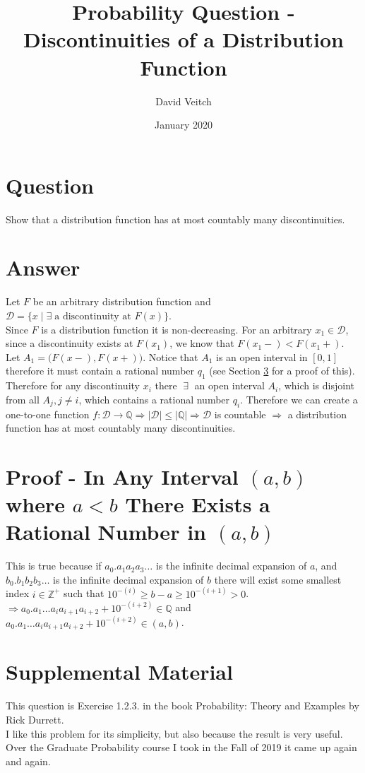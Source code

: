 \documentclass{article}
\title{Probability Question - Discontinuities of a Distribution Function  }
\author{David Veitch}
\date{January 2020}
\begin{document}
\maketitle

\section{Question}

Show that a distribution function has at most countably many
discontinuities.

\section{Answer}

Let $F$ be an arbitrary distribution function and $\mathcal{D} =\{x \; |\; \exists \; \text{a discontinuity at } F(x)\}$.\\

Since $F$ is a distribution function it is non-decreasing. For an arbitrary $x_1 \in \mathcal{D}$, since a discontinuity exists at $F(x_1)$, we know that $F(x_1-)<F(x_1+)$. Let $A_1=\big(F(x-),F(x+)\big)$. Notice that $A_1$ is an open interval in $[0,1]$ therefore it must contain a rational number $q_1$ (see Section \ref{intervalproof} for a proof of this). \\

Therefore for any discontinuity $x_i$ there $\; \exists \;$ an open interval $A_i$, which is disjoint from all $A_j, j\neq i$, which contains a rational number $q_i$. Therefore we can create a one-to-one function $f:\mathcal{D}\rightarrow \mathbb{Q} \Rightarrow |\mathcal{D}| \leq |\mathbb{Q}| \Rightarrow \mathcal{D}$ is countable $\Rightarrow$ a distribution function has at most countably many discontinuities.

\section{Proof - In Any Interval $(a,b)$ where $a<b$ There Exists a Rational Number in $(a,b)$}\label{intervalproof}

This is true because if $a_0.a_1a_2a_3\dots$ is the infinite decimal expansion of $a$, and $b_0.b_1b_2b_3\dots$ is the infinite decimal expansion of $b$ there will exist some smallest index $i \in \mathbb{Z}^+$ such that $10^{-(i)} \geq b-a \geq 10^{-(i+1)} > 0$.\\

$\Rightarrow a_0.a_1\dots a_ia_{i+1}a_{i+2} + 10^{-(i+2)} \in \mathbb{Q}$ and $a_0.a_1\dots a_ia_{i+1}a_{i+2} + 10^{-(i+2)} \in (a,b)$.

\section{Supplemental Material}

This question is Exercise 1.2.3. in the book Probability: Theory and Examples by Rick Durrett.\\

I like this problem for its simplicity, but also because the result is very useful. Over the Graduate Probability course I took in the Fall of 2019 it came up again and again.
\end{document}
